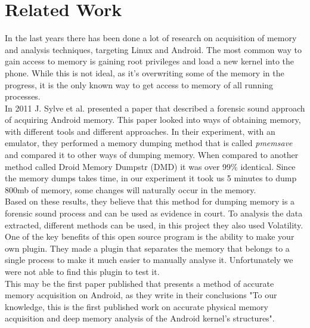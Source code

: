 \section{Related Work}
In the last years there has been done a lot of research on acquisition of memory
and analysis techniques, targeting Linux and Android. The most common way to 
gain access to memory is gaining root privileges and load a new kernel into the 
phone. While this is not ideal, as it’s overwriting some of the memory in the 
progress, it is the only known way to get access to memory of all running processes.\\

In 2011 J. Sylve et al. presented a paper that described a forensic sound 
approach of acquiring Android memory. \cite{acq_vol_android_mem} This paper looked 
into ways of obtaining memory, with different tools and different approaches. In 
their experiment, with an emulator, they performed a memory dumping method that 
is called \textit{pmemsave} and compared it to other ways of dumping memory. 
When compared to another method called Droid Memory Dumpstr (DMD) it was over 
99\% identical. Since the memory dumps takes time, in our experiment it took us 
5 minutes to dump 800mb of memory, some changes will naturally occur in the memory.\\

Based on these results, they believe that this method for dumping memory is a 
forensic sound process and can be used as evidence in court. To analysis the data 
extracted, different methods can be used, in this project they also used Volatility.
One of the key benefits of this open source program is the ability to make your 
own plugin. They made a plugin that separates the memory that belongs to a single 
process to make it much easier to manually analyse it. Unfortunately we were not 
able to find this plugin to test it.\\

This may be the first paper published that presents a method of accurate memory acquisition on
Android, as they write in their conclusions "To our knowledge, this is the first published work on
accurate physical memory acquisition and deep memory analysis of the Android kernel's structures".
